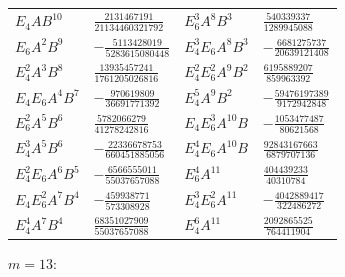 {\small\begin{tabular}{@{}l@{\ \ }l@{\qquad}l@{\ \ }l@{}}
$E_4 A B^{10}$ & $\tfrac{2131467191}{21134460321792}$ & $E_6^{3} A^{8} B^{3}$ & $\tfrac{540339337}{1289945088}$ \\
$E_6 A^{2} B^{9}$ & $-\tfrac{5113428019}{5283615080448}$ & $E_4^{3} E_6 A^{8} B^{3}$ & $-\tfrac{6681275737}{20639121408}$ \\
$E_4^{2} A^{3} B^{8}$ & $\tfrac{13935457241}{1761205026816}$ & $E_4^{2} E_6^{2} A^{9} B^{2}$ & $\tfrac{6195889207}{859963392}$ \\
$E_4 E_6 A^{4} B^{7}$ & $-\tfrac{970619809}{36691771392}$ & $E_4^{5} A^{9} B^{2}$ & $-\tfrac{59476197389}{9172942848}$ \\
$E_6^{2} A^{5} B^{6}$ & $\tfrac{5782066279}{41278242816}$ & $E_4 E_6^{3} A^{10} B$ & $-\tfrac{1053477487}{80621568}$ \\
$E_4^{3} A^{5} B^{6}$ & $-\tfrac{22336678753}{660451885056}$ & $E_4^{4} E_6 A^{10} B$ & $\tfrac{92843167663}{6879707136}$ \\
$E_4^{2} E_6 A^{6} B^{5}$ & $-\tfrac{6566555011}{55037657088}$ & $E_6^{4} A^{11}$ & $\tfrac{404439233}{40310784}$ \\
$E_4 E_6^{2} A^{7} B^{4}$ & $-\tfrac{459938771}{573308928}$ & $E_4^{3} E_6^{2} A^{11}$ & $-\tfrac{4042889417}{322486272}$ \\
$E_4^{4} A^{7} B^{4}$ & $\tfrac{68351027909}{55037657088}$ & $E_4^{6} A^{11}$ & $\tfrac{2092865525}{764411904}$ \\
\end{tabular}}\par\medskip
\noindent$m=13$:\nopagebreak\\[2pt]
